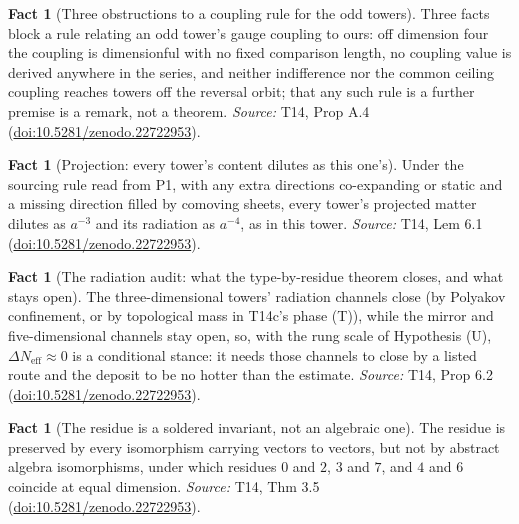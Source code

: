 \documentclass[11pt]{article}
\theoremstyle{definition}
\newtheorem{fact}[theorem]{Fact}
\theoremstyle{plain}
\begin{document}
\begin{fact}[Three obstructions to a coupling rule for the odd towers]\label{c:dark-matter.no-coupling-rule-odd-towers-follows}
Three facts block a rule relating an odd tower's gauge coupling to ours: off dimension four the coupling is dimensionful with no fixed comparison length, no coupling value is derived anywhere in the series, and neither indifference nor the common ceiling coupling reaches towers off the reversal orbit; that any such rule is a further premise is a remark, not a theorem.
\emph{Source:} T14, Prop A.4 (\href{https://doi.org/10.5281/zenodo.22722953}{doi:10.5281/zenodo.22722953}).
\end{fact}

\begin{fact}[Projection: every tower's content dilutes as this one's]\label{c:dark-matter.projection-every-towers-content-dilutes-ones}
Under the sourcing rule read from P1, with any extra directions co-expanding or static and a missing direction filled by comoving sheets, every tower's projected matter dilutes as $a^{-3}$ and its radiation as $a^{-4}$, as in this tower.
\emph{Source:} T14, Lem 6.1 (\href{https://doi.org/10.5281/zenodo.22722953}{doi:10.5281/zenodo.22722953}).
\end{fact}

\begin{fact}[The radiation audit: what the type-by-residue theorem closes, and what stays open]\label{c:dark-matter.radiation-audit-what-theorem-closes-what}
The three-dimensional towers' radiation channels close (by Polyakov confinement, or by topological mass in T14c's phase (T)), while the mirror and five-dimensional channels stay open, so, with the rung scale of Hypothesis (U), $\Delta N_{\mathrm{eff}} \approx 0$ is a conditional stance: it needs those channels to close by a listed route and the deposit to be no hotter than the estimate.
\emph{Source:} T14, Prop 6.2 (\href{https://doi.org/10.5281/zenodo.22722953}{doi:10.5281/zenodo.22722953}).
\end{fact}

\begin{fact}[The residue is a soldered invariant, not an algebraic one]\label{c:dark-matter.residue-soldered-invariant-not-algebraic-one}
The residue is preserved by every isomorphism carrying vectors to vectors, but not by abstract algebra isomorphisms, under which residues $0$ and $2$, $3$ and $7$, and $4$ and $6$ coincide at equal dimension.
\emph{Source:} T14, Thm 3.5 (\href{https://doi.org/10.5281/zenodo.22722953}{doi:10.5281/zenodo.22722953}).
\end{fact}
\end{document}
